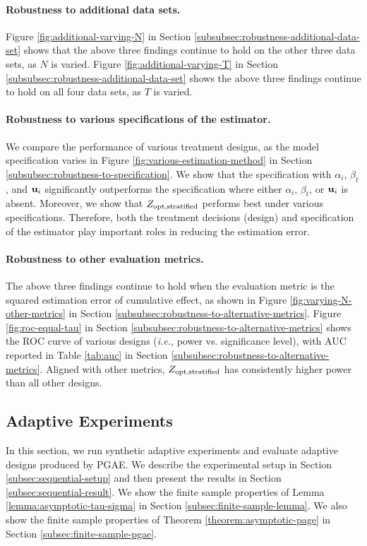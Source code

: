 \paragraph{Robustness to additional data sets.} Figure \ref{fig:additional-varying-N} in Section \ref{subsubsec:robustness-additional-data-set} shows that the above three findings continue to hold on the other three data sets, as $N$ is varied. Figure \ref{fig:additional-varying-T} in Section \ref{subsubsec:robustness-additional-data-set} shows the above three findings continue to hold on all four data sets, as $T$ is varied. 

{\blue 
\paragraph{Robustness to various specifications of the estimator.} 

We compare the performance of various treatment designs, as the model specification varies in Figure \ref{fig:various-estimation-method} in Section \ref{subsubsec:robustness-to-specification}. We show that the specification with $\alpha_i$, $\beta_t$, and $\mathbf{u}_i$ significantly outperforms the specification where either $\alpha_i$, $\beta_t$, or $\mathbf{u}_i$ is absent. Moreover, we show that $Z_{\textnormal{opt},\mathrm{stratified}}$ performs best under various specifications. Therefore, both the treatment decisions (design) and specification of the estimator play important roles in reducing the estimation error.}

 \paragraph{Robustness to other evaluation metrics.} The above three findings continue to hold when the evaluation metric is the squared estimation error of cumulative effect, as shown in Figure \ref{fig:varying-N-other-metrics} in Section \ref{subsubsec:robustness-to-alternative-metrics}. Figure \ref{fig:roc-equal-tau} in Section \ref{subsubsec:robustness-to-alternative-metrics} shows the ROC curve of various designs ({\it i.e.}, power vs. significance level), with AUC reported in Table \ref{tab:auc} in Section \ref{subsubsec:robustness-to-alternative-metrics}. Aligned with other metrics, $Z_{\textnormal{opt},\mathrm{stratified}}$ has consistently higher power than all other designs.



\subsection{Adaptive Experiments}\label{subsec:empirical-sequential}
In this section, we run synthetic adaptive experiments and evaluate adaptive designs produced by PGAE. We describe the experimental setup in Section \ref{subsec:sequential-setup} and then present the results in Section \ref{subsec:sequential-result}. We show the finite sample properties of Lemma \ref{lemma:asymptotic-tau-sigma} in Section \ref{subsec:finite-sample-lemma}. We also show the finite sample properties of Theorem 
\ref{theorem:asymptotic-page}  in Section \ref{subsec:finite-sample-pgae}.

